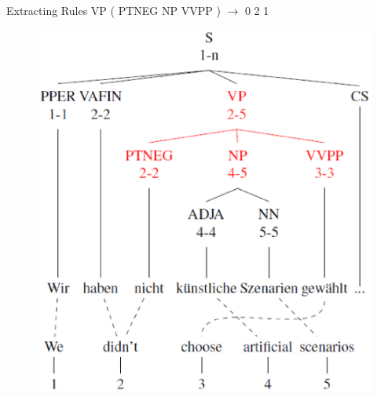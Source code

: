 \documentclass[18pt]{beamer}
\begin{document}
\begin{frame}{Extracting Rules {\hfill \small \color{black} VP ( PTNEG NP VVPP ) $\rightarrow$ 0 2 1}}
\begin{figure}
\centering
\includegraphics[scale=0.4]{extraction.eps}
\end{figure}
\end{frame}
\end{document}
